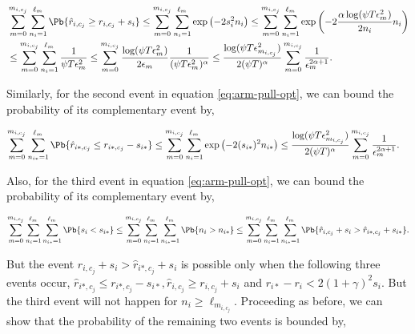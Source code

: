 \begin{customproof}{3}
\begin{align*}
&\sum_{m=0}^{m_{i,c_j}}\sum_{n_i=1}^{\ell_{m_{}}}\Pb\lbrace \hat{r}_{i,c_j} \geq  r_{i,c_j} + s_i \rbrace \leq \sum_{m=0}^{m_{i,c_j}}\sum_{n_i=1}^{\ell_{m_{}}}\exp\left(-2s_i^2n_i \right)
\leq \sum_{m=0}^{m_{i,c_j}}\sum_{n_i=1}^{\ell_{m_{}}}\exp\left(-2\dfrac{\alpha\log(\psi T\epsilon_{m_{}}^2)}{2n_i}n_i \right)\\
&\leq \sum_{m=0}^{m_{i,c_j}}\sum_{n_i=1}^{\ell_{m_{}}}\dfrac{1}{\psi T\epsilon_{m_{}}^2} \leq \sum_{m=0}^{m_{i,c_j}}\dfrac{\log(\psi T\epsilon_{m_{}}^2)}{2\epsilon_{m_{}}}\dfrac{1}{(\psi T\epsilon_{m_{}}^2)^{\alpha}} \leq  \dfrac{\log(\psi T  \epsilon_{m_{i,c_j}}^2)}{2(\psi T)^{\alpha}}\sum_{m=0}^{m_{i,c_j}}\dfrac{1}{\epsilon_{m_{}}^{2\alpha +1}}.
\end{align*}

Similarly, for the second event in equation \ref{eq:arm-pull-opt}, we can bound the probability of its complementary event by,

\begin{align*}
\sum_{m=0}^{m_{i,c_j}}\sum_{n_{i*} =1}^{\ell_{m_{}}}\Pb\lbrace \hat{r}_{i*,c_j} \leq  r_{i*,c_j} - s_{i*} \rbrace &\leq \sum_{m=0}^{m_{i,c_j}}\sum_{n_i=1}^{\ell_{m_{}}}\exp\left(-2(s_{i*})^2n_{i*} \right)\leq \dfrac{\log(\psi T \epsilon_{m_{i,c_j}}^2)}{2(\psi T)^{\alpha}}\sum_{m=0}^{m_{i,c_j}}\dfrac{1}{\epsilon_{m_{}}^{2\alpha +1}}.
\end{align*}


Also, for the third event in equation \ref{eq:arm-pull-opt}, we can bound the probability of its complementary event by,

\begin{align*}
\sum_{m=0}^{m_{i,c_j}}\sum_{n_i=1}^{\ell_{m_{}}}\sum_{n_{i*}=1}^{\ell_{m_{}}}\Pb\lbrace s_i < s_{i*}\rbrace \leq \sum_{m=0}^{m_{i,c_j}}\sum_{n_i=1}^{\ell_{m_{}}}\sum_{n_{i*}=1}^{\ell_{m_{}}}\Pb\lbrace n_i > n_{i*}\rbrace \leq \sum_{m=0}^{m_{i,c_j}}\sum_{n_i=1}^{\ell_{m_{}}}\sum_{n_{i*}=1}^{\ell_{m_{}}}\Pb\lbrace \hat{r}_{i,c_j} + s_i > \hat{r}_{i*,c_j} + s_{i*} \rbrace.
\end{align*}

But the event $\hat{r}_{i,c_j} + s_i > \hat{r}_{i*,c_j} + s_i$ is possible only when the following three events occur, $\hat{r}_{i*,c_j} \leq r_{i*,c_j} - s_{i*} , \hat{r}_{i,c_j} \geq r_{i,c_j} + s_i$ and $r_{i*}-r_{i} < 2(1+\gamma)^2 s_i $. But the third event will not happen for $n_i\geq \ell_{m_{i,c_j}}$. Proceeding as before, we can show that the probability of the remaining two events is bounded by,


\end{customproof}

